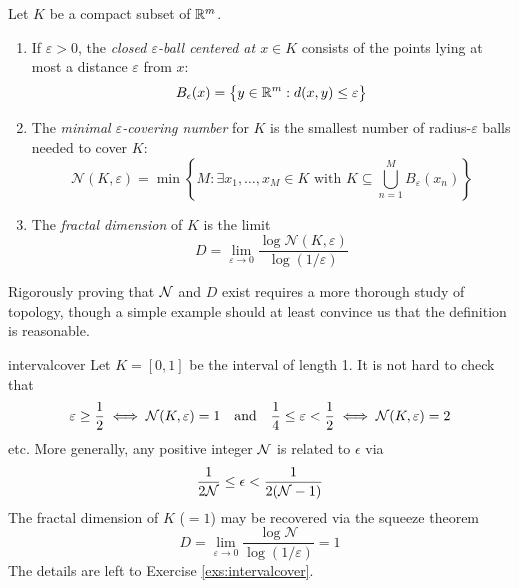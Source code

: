 \begin{defn}{}{}
	Let $K$ be a compact subset of $\mathbb{R}^m$.
	\begin{enumerate}
	  \item If $\varepsilon>0$, the \emph{closed $\varepsilon$-ball centered at $x\in K$} consists of the points lying at most a distance $\varepsilon$ from $x$:
		\[
			B_\epsilon(x)=\big\{y\in\mathbb{R}^m:d(x,y)\le\varepsilon\big\}
		\]
		\item The \emph{minimal $\varepsilon$-covering number} for $K$ is the smallest number of radius-$\varepsilon$ balls needed to cover $K$:
		\[
			\mathcal N(K,\varepsilon)=\min\left\{M:\exists x_1,\ldots,x_M\in K\text{ with }K\subseteq \bigcup\limits_{n=1}^MB_\varepsilon(x_n)\right\}
		\]
		\item The \emph{fractal dimension} of $K$ is the limit
		\[
			D=\lim_{\varepsilon\to 0}\frac{\log\mathcal N(K,\varepsilon)}{\log (1/\varepsilon)}
		\]
		\vspace{-\parsep}
	\end{enumerate}
\end{defn}

Rigorously proving that $\mathcal{N}$ and $D$ exist requires a more thorough study of topology, though a simple example should at least convince us that the definition is reasonable.

\begin{example}{}{intervalcover}
	Let $K=[0,1]$ be the interval of length 1. It is not hard to check that
	\[
		\varepsilon\ge\frac 12\iff \mathcal{N}(K,\varepsilon)=1\quad\text{and}\quad 
		\frac 14\le \varepsilon<\frac 12\iff \mathcal{N}(K,\varepsilon)=2
	\]
	etc. More generally, any positive integer $\mathcal{N}$ is related to $\epsilon$ via
	\[
		\frac 1{2\mathcal{N}}\le\epsilon<\frac 1{2(\mathcal{N}-1)}
	\]
	The fractal dimension of $K$ ($=1$) may be recovered via the squeeze theorem
	\[%
		D=\lim_{\varepsilon\to 0}\frac{\log\mathcal N}{\log (1/\varepsilon)}=1
	\]
	The details are left to Exercise \ref{exs:intervalcover}.
\end{example}


